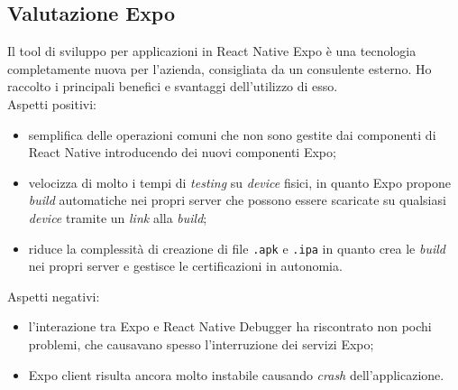 \subsection{Valutazione Expo}
Il tool di sviluppo per applicazioni in React Native Expo è una tecnologia completamente nuova per l'azienda, consigliata da un consulente esterno. Ho raccolto i principali benefici e svantaggi dell'utilizzo di esso.\\
Aspetti positivi:
\begin{itemize}
	\item semplifica delle operazioni comuni che non sono gestite dai componenti di React Native introducendo dei nuovi componenti Expo;
	\item velocizza di molto i tempi di \emph{testing} su \emph{device} fisici, in quanto Expo propone \emph{build} automatiche nei propri server che possono essere scaricate su qualsiasi \emph{device} tramite un \emph{link} alla \emph{build};
	\item riduce la complessità di creazione di file \texttt{.apk} e \texttt{.ipa} in quanto crea le \emph{build} nei propri server e gestisce le certificazioni in autonomia.
\end{itemize}
Aspetti negativi:
\begin{itemize}
	\item l'interazione tra Expo e React Native Debugger ha riscontrato non pochi problemi, che causavano spesso l'interruzione dei servizi Expo;
	\item Expo client risulta ancora molto instabile causando \emph{crash} dell'applicazione.
\end{itemize}
\newpage
